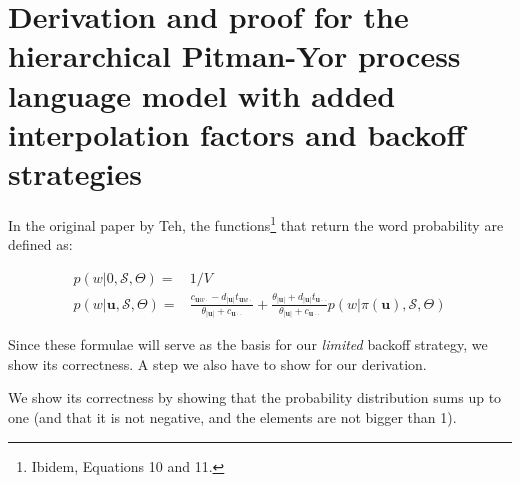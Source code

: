 \chapter{Derivation and proof for the hierarchical Pitman-Yor process language model with added interpolation factors and backoff strategies}\label{apx:proofinterpolform}

In the original paper by Teh,\autocite{teh2006hierarchical} the functions\footnote{Ibidem, Equations 10 and 11.} that return the word probability are defined as:

\begin{equation}
\begin{split}
p(w | 0, \mathcal{S}, \Theta) =& 1/V \\
p(w | \mathbf{u}, \mathcal{S}, \Theta) =& \frac{c_{\mathbf{u}w\cdot} - d_{|\mathbf{u}|}t_{\mathbf{u}w\cdot}}{\theta_{|\mathbf{u}|}+c_{\mathbf{u}\cdot\cdot}} + \frac{\theta_{|\mathbf{u}|} + d_{|\mathbf{u}|}t_{\mathbf{u}\cdot\cdot}}{\theta_{|\mathbf{u}|}+c_{\mathbf{u}\cdot\cdot}} p(w | \pi(\mathbf{u}), \mathcal{S}, \Theta)
\end{split}
\end{equation}

Since these formulae will serve as the basis for our \textsl{limited} backoff strategy, we show its correctness. A step we also have to show for our derivation.

We show its correctness by showing that the probability distribution sums up to one (and that it is not negative, and the elements are not bigger than 1).

